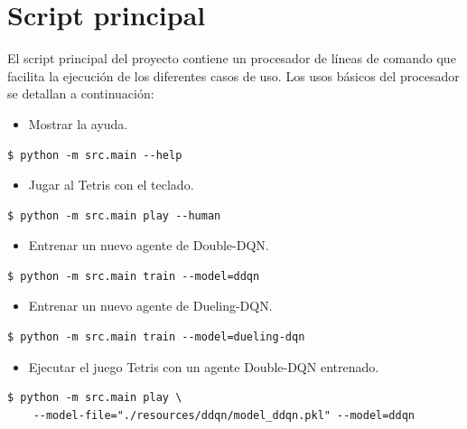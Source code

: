 
\chapter{Script principal} %

\label{Script principal}

El script principal del proyecto contiene un procesador de líneas de comando que facilita la ejecución de los diferentes casos de uso. Los usos básicos del procesador se detallan a continuación:

\begin{itemize}
    \item Mostrar la ayuda.
\end{itemize}
\begin{verbatim}
$ python -m src.main --help
\end{verbatim}

\begin{itemize}
    \item Jugar al Tetris con el teclado.
\end{itemize}
\begin{verbatim}
$ python -m src.main play --human
\end{verbatim}

\begin{itemize}
    \item Entrenar un nuevo agente de Double-DQN.
\end{itemize}
\begin{verbatim}
$ python -m src.main train --model=ddqn
\end{verbatim}

\begin{itemize}
    \item Entrenar un nuevo agente de Dueling-DQN.
\end{itemize}
\begin{verbatim}
$ python -m src.main train --model=dueling-dqn
\end{verbatim}

\begin{itemize}
    \item Ejecutar el juego Tetris con un agente Double-DQN entrenado.
\end{itemize}
\begin{verbatim}
$ python -m src.main play \
    --model-file="./resources/ddqn/model_ddqn.pkl" --model=ddqn
\end{verbatim}

